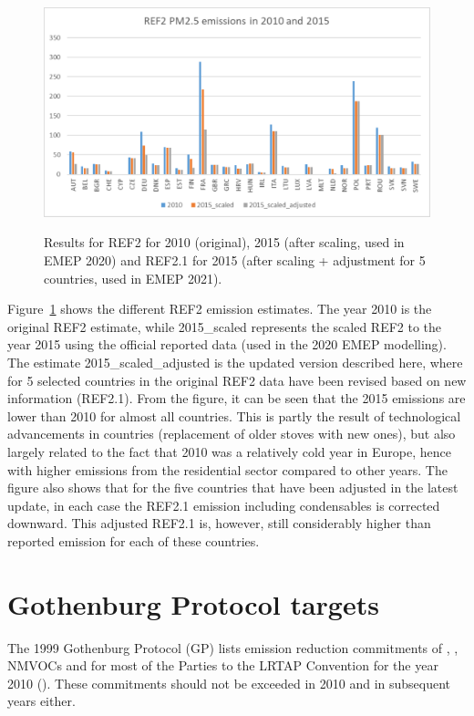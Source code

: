 \begin{figure}[h]
\centering
{\includegraphics*[viewport=1 1 740 400,clip,scale=0.45]{FIGS_CEIP/Fig3.pdf}}
\caption{Results for REF2 for 2010 (original), 2015 (after scaling, used in EMEP 2020) and REF2.1 for 2015 (after scaling + adjustment for 5 countries, used in EMEP 2021).}
\label{fig:CEIP3}
\end{figure}


Figure~\ref{fig:CEIP3} shows the different REF2 emission estimates. The year 2010 is the original REF2 estimate, while 2015\_scaled represents the scaled REF2 to the year 2015 using the official reported data (used in the 2020 EMEP modelling). The estimate 2015\_scaled\_adjusted is the updated version described here, where for 5 selected countries in the original REF2 data have been revised based on new information (REF2.1).
From the figure, it can be seen that the 2015 emissions are lower than 2010 for almost all countries. This is partly the result of technological advancements in countries (replacement of older stoves with new ones), but also largely related to the fact that 2010 was a relatively cold year in Europe, hence with higher emissions from the residential sector compared to other years. The figure also shows that for the five countries that have been adjusted in the latest update, in each case the REF2.1 emission including condensables is corrected downward. This adjusted REF2.1 is, however, still considerably higher than reported emission for each of these countries.

\section{Gothenburg Protocol targets}
\label{sec:GP}

The 1999 Gothenburg Protocol (GP) lists emission reduction commitments of  \nox,
\sox, NMVOCs and \nhiii for most of the Parties to the LRTAP Convention for the year 2010 (\cite{UNECE1999}). These commitments should not be exceeded in 2010 and in subsequent years either.

